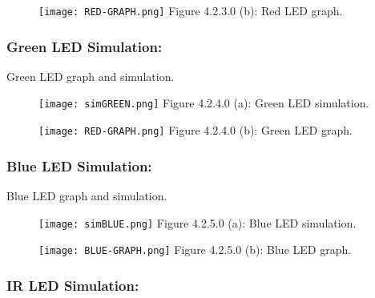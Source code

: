 \documentclass[10pt,a4paper]{article}
\begin{document}
\begin{figure}[H]
\texttt{[image: RED-GRAPH.png]}
\centering \linebreak \linebreak Figure 4.2.3.0 (b): Red LED graph.
\end{figure}

\pagebreak

\subsubsection{Green LED Simulation:}

Green LED graph and simulation.

\begin{figure}[H]
\texttt{[image: simGREEN.png]}
\centering \linebreak \linebreak Figure 4.2.4.0 (a): Green LED simulation.
\end{figure}

\begin{figure}[H]
\texttt{[image: RED-GRAPH.png]}
\centering \linebreak \linebreak Figure 4.2.4.0 (b): Green LED graph.
\end{figure}

\pagebreak

\subsubsection{Blue LED Simulation:}

Blue LED graph and simulation.

\begin{figure}[H]
\texttt{[image: simBLUE.png]}
\centering \linebreak \linebreak Figure 4.2.5.0 (a): Blue LED simulation.
\end{figure}

\begin{figure}[H]
\texttt{[image: BLUE-GRAPH.png]}
\centering \linebreak \linebreak Figure 4.2.5.0 (b): Blue LED graph.
\end{figure}

\pagebreak

\subsubsection{IR LED Simulation:}
\end{document}
